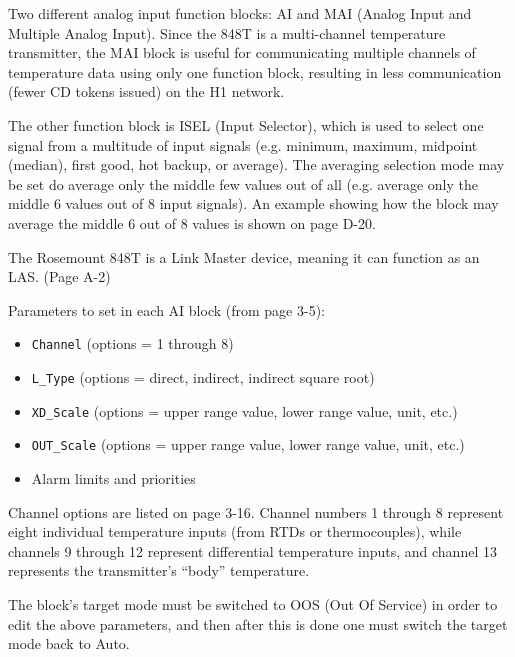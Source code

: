 





Two different analog input function blocks: AI and MAI (Analog Input and Multiple Analog Input).  Since the 848T is a multi-channel temperature transmitter, the MAI block is useful for communicating multiple channels of temperature data using only one function block, resulting in less communication (fewer CD tokens issued) on the H1 network.

\vskip 10pt

The other function block is ISEL (Input Selector), which is used to select one signal from a multitude of input signals (e.g. minimum, maximum, midpoint (median), first good, hot backup, or average).  The averaging selection mode may be set do average only the middle few values out of all (e.g. average only the middle 6 values out of 8 input signals).  An example showing how the block may average the middle 6 out of 8 values is shown on page D-20.

\vskip 10pt

The Rosemount 848T is a Link Master device, meaning it can function as an LAS.  (Page A-2)

\vskip 10pt

\noindent
Parameters to set in each AI block (from page 3-5):

\begin{itemize}
\item{} {\tt Channel} (options = 1 through 8)
\item{} {\tt L\_Type} (options = direct, indirect, indirect square root)
\item{} {\tt XD\_Scale} (options = upper range value, lower range value, unit, etc.)
\item{} {\tt OUT\_Scale} (options = upper range value, lower range value, unit, etc.) 
\item{} Alarm limits and priorities
\end{itemize}

Channel options are listed on page 3-16.  Channel numbers 1 through 8 represent eight individual temperature inputs (from RTDs or thermocouples), while channels 9 through 12 represent differential temperature inputs, and channel 13 represents the transmitter's ``body'' temperature.

The block's target mode must be switched to OOS (Out Of Service) in order to edit the above parameters, and then after this is done one must switch the target mode back to Auto.




